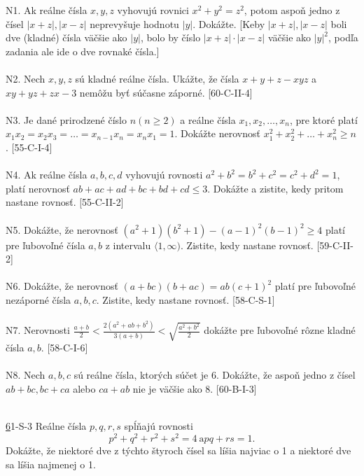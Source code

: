 N1. Ak reálne čísla $x, y, z$ vyhovujú rovnici $x^2+y^2
= z^2$, potom aspoň jedno z čísel $|x+z|,
|x - z|$ neprevyšuje hodnotu $|y|$. Dokážte. [Keby $|x + z|, |x - z|$ boli dve (kladné) čísla
väčšie ako $|y|$, bolo by číslo $|x + z| \cdot |x - z|$ väčšie ako $|y|^2$, podľa zadania ale ide o dve
rovnaké čísla.]\\
\\
N2. Nech $x, y, z$ sú kladné reálne čísla. Ukážte, že čísla $x + y + z - xyz$ a $xy + yz + zx - 3$
nemôžu byť súčasne záporné. [60-C-II-4]\\
\\
N3. Je dané prirodzené číslo $n (n \geq 2)$ a reálne čísla $x_1, x_2, \ldots , x_n$, pre ktoré platí $x_1x_2
= x_2x_3 = \ldots = x_{n-1}x_n = x_nx_1 = 1$. Dokážte nerovnosť $x_1^2+ x_2^2+ \ldots + x_n^2\geq n$.
[55-C-I-4]\\
\\
N4. Ak reálne čísla $a, b, c, d$ vyhovujú rovnosti $a^2+ b^2= b^2+ c^2= c^2+ d^2= 1$, platí nerovnosť $ab + ac + ad + bc + bd + cd \leq 3$. Dokážte a zistite, kedy pritom nastane rovnosť. [55-C-II-2]\\
\\
N5. Dokážte, že nerovnosť $(a^2+ 1)(b^2+ 1) - (a - 1)^2
(b - 1)^2\geq  4$ platí pre ľubovoľné čísla $a, b$ z intervalu $\langle 1, \infty)$. Zistite, kedy nastane rovnosť. [59-C-II-2]\\
\\
N6. Dokážte, že nerovnosť $(a + bc)(b + ac) = ab(c + 1)^2$ platí pre ľubovoľné nezáporné čísla $a, b, c$. Zistite, kedy nastane rovnosť. [58-C-S-1]\\
\\
N7. Nerovnosti $\frac{a+b}{2}< \frac{2(a^2+ab+b^2)}{3(a+b)}<\sqrt{\frac{a^2+b^2}{2}}$  dokážte pre ľubovoľné rôzne kladné čísla $a, b$. [58-C-I-6]\\
\\
N8. Nech $a, b, c$ sú reálne čísla, ktorých súčet je 6. Dokážte, že aspoň jedno z čísel $ab + bc, bc + ca$ alebo $ca + ab$ nie je väčšie ako 8. [60-B-I-3]\\
\\
\begin{tcolorbox}[breakable,notitle,boxrule=0pt,colback=light-gray,colframe=light-gray]\ul 61-S-3
Reálne čísla $p, q, r, s$ spĺňajú rovnosti
$$p^2+ q^2+ r^2+ s^2= 4 \ \mathrm{a} pq + rs = 1.$$
Dokážte, že niektoré dve z týchto štyroch čísel sa líšia najviac o 1 a niektoré dve sa líšia
najmenej o 1.

\end{tcolorbox}

